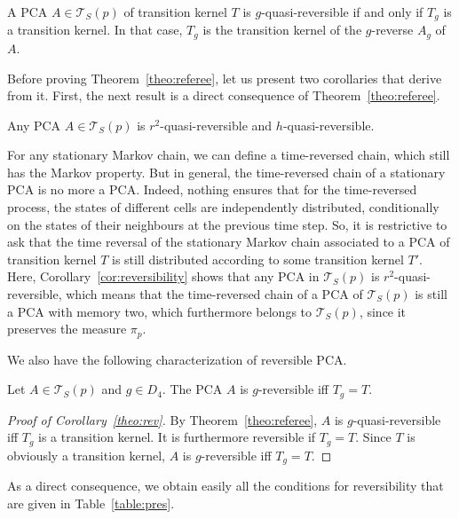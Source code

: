 \documentclass[AHL,Unicode,longabstracts]{cedram}
\newcounter{a}
\newcommand{\triang}[2]{\mathcal{T}_{#1} \left(#2 \right)}
\begin{document}
\begin{theo}\label{theo:referee}
A PCA $A \in \triang{S}{p}$ of transition kernel $T$ is $g$-quasi-reversible if and only if $T_g$ is a transition kernel. In that case, $T_g$ is the transition kernel of the $g$-reverse $A_g$ of $A$.
\end{theo}

Before proving Theorem~\ref{theo:referee}, let us present two corollaries that derive from it. First, the next result is a direct consequence of Theorem~\ref{theo:referee}.

\begin{corollary}\label{cor:reversibility}
Any PCA $A \in \triang{S}{p}$ is $r^2$-quasi-reversible and $h$-quasi-reversible.
\end{corollary}

For any stationary Markov chain, we can define a time-reversed chain, which still has the Markov property. But in general, the time-reversed chain of a stationary PCA is no more a PCA. Indeed, nothing ensures that for the time-reversed process, the states of different cells are independently distributed, conditionally on the states of their neighbours at the previous time step. So, it is restrictive to ask that the time reversal of the stationary Markov chain associated to a PCA of transition kernel $T$ is still distributed according to some transition kernel $T'$. Here, Corollary~\ref{cor:reversibility} shows that any PCA in $\triang{S}{p}$ is $r^2$-quasi-reversible, which means that the time-reversed chain of a PCA of $\triang{S}{p}$ is still a PCA with memory two, which furthermore belongs to $\triang{S}{p}$, since it preserves the measure $\pi_p$.

We also have the following characterization of reversible PCA.

\begin{coro}\label{theo:rev}
Let $A \in \triang{S}{p}$ and $g\in D_4$. The PCA $A$ is $g$-reversible iff $T_g=T$.
\end{coro}

\begin{proof}[Proof of Corollary~\ref{theo:rev}]
By Theorem~\ref{theo:referee}, $A$ is $g$-quasi-reversible iff $T_g$ is a transition kernel. It is furthermore reversible if $T_g=T$. Since $T$ is obviously a transition kernel, $A$ is $g$-reversible iff $T_g=T$.
\end{proof}

As a direct consequence, we obtain easily all the conditions for reversibility that are given in Table~\ref{table:pres}.
\end{document}
